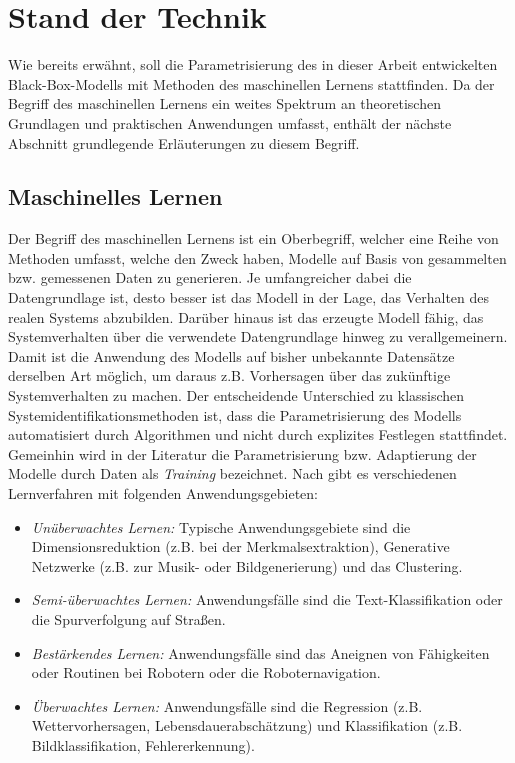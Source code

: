 \chapter{Stand der Technik}

Wie bereits erwähnt, soll die Parametrisierung des in dieser Arbeit entwickelten Black-Box-Modells mit Methoden des maschinellen Lernens stattfinden. Da der Begriff des maschinellen Lernens ein weites Spektrum an theoretischen Grundlagen und praktischen Anwendungen umfasst, enthält der nächste Abschnitt grundlegende Erläuterungen zu diesem Begriff.


\section{Maschinelles Lernen}
\label{cha:machine_learning}
Der Begriff des maschinellen Lernens ist ein Oberbegriff, welcher eine Reihe von Methoden umfasst, welche den Zweck haben, Modelle auf Basis von gesammelten bzw. gemessenen Daten zu generieren. Je umfangreicher dabei die Datengrundlage ist, desto besser ist das Modell in der Lage, das Verhalten des realen Systems abzubilden.  Darüber hinaus ist das erzeugte Modell fähig, das Systemverhalten über die verwendete Datengrundlage hinweg zu verallgemeinern. Damit ist die Anwendung des Modells auf bisher unbekannte Datensätze derselben Art möglich, um daraus z.B. Vorhersagen über das zukünftige Systemverhalten zu machen.  Der entscheidende Unterschied zu klassischen Systemidentifikationsmethoden ist, dass die Parametrisierung des Modells automatisiert durch Algorithmen und nicht durch explizites Festlegen stattfindet. \cite{Duriez.2017} \\

Gemeinhin wird in der Literatur die Parametrisierung bzw. Adaptierung der Modelle durch Daten als \textit{Training} bezeichnet. Nach \cite{Dobel.2018} gibt es verschiedenen Lernverfahren mit folgenden Anwendungsgebieten:

\begin{itemize}
	\item \textit{Unüberwachtes Lernen:} Typische Anwendungsgebiete sind die Dimensionsreduktion (z.B. bei der Merkmalsextraktion), Generative Netzwerke (z.B. zur Musik- oder Bildgenerierung) und das Clustering.
	\item \textit{Semi-überwachtes Lernen:} Anwendungsfälle sind die Text-Klassifikation oder die Spurverfolgung auf Straßen.
	\item \textit{Bestärkendes Lernen:} Anwendungsfälle sind das Aneignen von Fähigkeiten oder Routinen bei Robotern oder die Roboternavigation.
	\item \textit{Überwachtes Lernen:} Anwendungsfälle sind die Regression (z.B. Wettervorhersagen, Lebensdauerabschätzung) und Klassifikation (z.B. Bildklassifikation, Fehlererkennung). \cite{Dobel.2018}
\end{itemize} 

